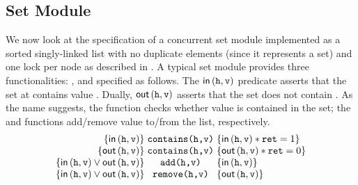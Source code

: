 \subsection{Set Module}
We now look at the specification of a concurrent set module implemented as a sorted singly-linked list with no duplicate elements (since it represents a set) and one lock per node as described in \cite{cap-ecoop10}. A typical set module provides three functionalities: ,  and  specified as follows. The $\textsf{in}\left(\texttt{h}, \texttt{v}\right) $ predicate asserts that the set at  contains value . Dually, $\textsf{out}\left(\texttt{h}, \texttt{v}\right)$ asserts that the set does not contain . As the name suggests, the  function checks whether value  is contained in the set; the  and  functions add/remove value  to/from the list, respectively. 
%
\[
\begin{array}{@{} r @{\hspace*{3pt}} c @{\hspace*{3pt}} l @{}}
	\left\{ \inSet{\var{h}}{\var{v}} \right\} & \command{contains(h,v)} & \left\{ \inSet{\var{h}}{\var{v}} * \var{ret} = 1 \right\} \\
	
	\left\{ \outSet{\var{h}}{\var{v}} \right\} & \command{contains(h,v)} & \left\{ \outSet{\var{h}}{\var{v}} * \var{ret} = 0 \right\} \\
	
	\left\{ \inSet{\var{h}}{\var{v}} \lor \outSet{\var{h}}{\var{v}}  \right\} & \command{add(h,v)} & \left\{ \inSet{\var{h}}{\var{v}} \right\}\\ 
	
	\left\{ \inSet{\var{h}}{\var{v}} \lor \outSet{\var{h}}{\var{v}}  \right\} & \command{remove(h,v)} & \left\{ \outSet{\var{h}}{\var{v}} \right\} 
\end{array}
\]
%


